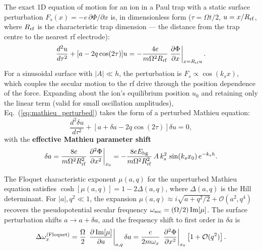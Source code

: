 \documentclass[12pt,a4paper]{article}
\begin{document}
The exact 1D equation of motion for an ion in a Paul trap with a static
surface perturbation $F_s(x) = -e\,\partial\Phi/\partial x$ is, in
dimensionless form ($\tau = \Omega t/2$, $u = x/R_{\rm rf}$, where
$R_{\rm rf}$ is the characteristic trap dimension --- the distance
from the trap centre to the nearest rf electrode):
\begin{equation}
\frac{d^2 u}{d\tau^2} + [a - 2q\cos(2\tau)]u
    = -\frac{4e}{m\Omega^2 R_{\rm rf}}
       \left.\frac{\partial\Phi}{\partial x}\right|_{x = R_{\rm rf}u}.
\label{eq:mathieu_perturbed}
\end{equation}
For a sinusoidal surface with $|A| \ll h$, the perturbation is
$F_s \propto \cos(k_s x)$, which couples the secular motion to the rf drive
through the position dependence of the force.  Expanding about the ion's
equilibrium position $u_0$ and retaining only the linear term (valid for
small oscillation amplitudes), Eq.~(\ref{eq:mathieu_perturbed}) takes the
form of a perturbed Mathieu equation:
\begin{equation}
\frac{d^2\delta u}{d\tau^2} + [a + \delta a - 2q\cos(2\tau)]\delta u = 0,
\label{eq:mathieu_pert_linear}
\end{equation}
with the \textbf{effective Mathieu parameter shift}
\begin{equation}
\delta a = \frac{8e}{m\Omega^2 R_{\rm rf}^2}
        \left.\frac{\partial^2\Phi}{\partial x^2}\right|_{x_0}
      = -\frac{8e E_{\rm bg}}{m\Omega^2 R_{\rm rf}^2}\,
        A\,k_s^2\,\sin(k_s x_0)\,e^{-k_s h}.
\label{eq:delta_a}
\end{equation}

The Floquet characteristic exponent $\mu(a,q)$ for the unperturbed Mathieu
equation satisfies $\cosh[\mu(a,q)] = 1 - 2\Delta(a,q)$, where $\Delta(a,q)$
is the Hill determinant.  For $|a|, q^2 \ll 1$, the expansion
$\mu(a,q) \approx i\sqrt{a + q^2/2} + \mathcal{O}(a^2, q^4)$ recovers the
pseudopotential secular frequency $\omega_{\rm sec} = (\Omega/2)\,{\rm
Im}[\mu]$.  The surface perturbation shifts $a \to a + \delta a$, and the
frequency shift to first order in $\delta a$ is
\begin{equation}
\Delta\omega_x^{\rm(Floquet)} = \frac{\Omega}{2}\,
    \left.\frac{\partial\,{\rm Im}[\mu]}{\partial a}\right|_{a,q}\delta a
    = \frac{e}{2m\omega_x}\,
       \left.\frac{\partial^2\Phi}{\partial x^2}\right|_{x_0}
       \left[1 + \mathcal{O}(q^2)\right].
\label{eq:floquet_result}
\end{equation}
\end{document}
